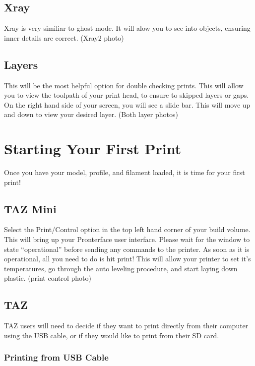 \subsection{Xray}

Xray is very similiar to ghost mode. It will alow you to see into objects, ensuring inner details are correct. (Xray2 photo)

\subsection{Layers}

This will be the most helpful option for double checking prints. This will allow you to view the toolpath of your print head, to ensure to skipped layers or gaps. On the right hand side of your screen, you will see a slide bar. This will move up and down to view your desired layer. (Both layer photos)

\section{Starting Your First Print}

Once you have your model, profile, and filament loaded, it is time for your first print! 

\subsection{TAZ Mini}

Select the Print/Control option in the top left hand corner of your build volume. This will bring up your Pronterface user interface. Please wait for the window to state “operational” before sending any commands to the printer. As soon as it is operational, all you need to do is hit print! This will allow your printer to set it's temperatures, go through the auto leveling procedure, and start laying down plastic. (print control photo)

\subsection{TAZ}

TAZ users will need to decide if they want to print directly from their computer using the USB cable, or if they would like to print from their SD card. 

\subsubsection{Printing from USB Cable}

